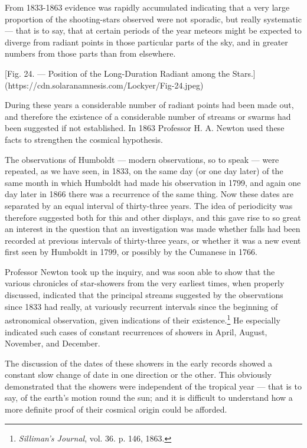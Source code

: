 \documentclass[a4paper, 12pt, oneside, polutonikogreek, english]{article}
\begin{document}
From 1833-1863 evidence was rapidly accumulated indicating that a very large proportion of the shooting-stars observed were not sporadic, but really systematic --- that is to say, that at certain periods of the year meteors might be expected to diverge from radiant points in those particular parts of the sky, and in greater numbers from those parts than from elsewhere.

[Fig. 24. --- Position of the Long-Duration Radiant among the Stars.](https://cdn.solaranamnesis.com/Lockyer/Fig-24.jpeg)

During these years a considerable number of radiant points had been made out, and therefore the existence of a considerable number of streams or swarms had been suggested if not established. In 1863 Professor H. A. Newton used these facts to strengthen the cosmical hypothesis.

The observations of Humboldt --- modern observations, so to speak --- were repeated, as we have seen, in 1833, on the same day (or one day later) of the same month in which Humboldt had made his observation in 1799, and again one day later in 1866 there was a recurrence of the same thing. Now these dates are separated by an equal interval of thirty-three years. The idea of periodicity was therefore suggested both for this and other displays, and this gave rise to so great an interest in the question that an investigation was made whether falls had been recorded at previous intervals of thirty-three years, or whether it was a new event first seen by Humboldt in 1799, or possibly by the Cumanese in 1766.

Professor Newton took up the inquiry, and was soon able to show that the various chronicles of star-showers from the very earliest times, when properly discussed, indicated that the principal streams suggested by the observations since 1833 had really, at variously recurrent intervals since the beginning of astronomical observation, given indications of their existence.\footnote{\emph{Silliman's Journal}, vol. 36. p. 146, 1863.} He especially indicated such cases of constant recurrences of showers in April, August, November, and December.

The discussion of the dates of these showers in the early records showed a constant slow change of date in one direction or the other. This obviously demonstrated that the showers were independent of the tropical year --- that is to say, of the earth's motion round the sun; and it is difficult to understand how a more definite proof of their cosmical origin could be afforded.
\end{document}
